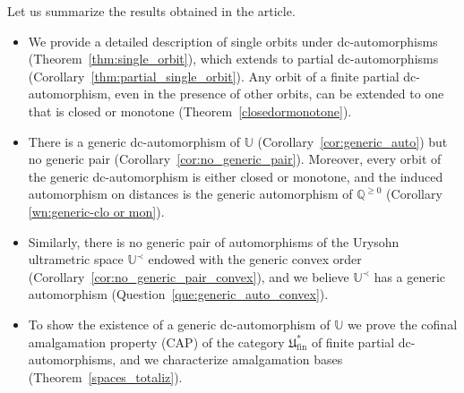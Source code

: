 \documentclass[oneside,notitlepage,12pt]{article}
\theoremstyle{definition}
\theoremstyle{remark}
\newcommand \Q {\mathbb{Q}}
\newcommand \Qpos {\Q^{\geq 0}}
\newcommand \U {\mathbb{U}}
\newcommand \fin {{\operatorname{fin}}}
\newcommand \Ult {\mathfrak{U}}
\begin{document}
Let us summarize the results obtained in the article.
\begin{itemize}
    \item We provide a detailed description of single orbits under dc-automorphisms  (Theorem~\ref{thm:single_orbit}), which extends to partial dc-automorphisms (Corollary~\ref{thm:partial_single_orbit}).
    Any orbit of a finite partial dc-automorphism, even in the presence of other orbits, can be extended to one that is closed or monotone (Theorem~\ref{closedormonotone}).
    
    \item There is a generic dc-automorphism of $\U$ (Corollary~\ref{cor:generic_auto}) but no generic pair (Corollary~\ref{cor:no_generic_pair}).
    Moreover, every orbit of the generic dc-automorphism is either closed or monotone, and the induced automorphism on distances is the generic automorphism of $\Qpos$ (Corollary \ref{wn:generic-clo or mon}).

    \item Similarly, there is no generic pair of automorphisms of the Urysohn ultrametric space $\U^\prec$ endowed with the generic convex order (Corollary~\ref{cor:no_generic_pair_convex}), and we believe $\U^\prec$ has a generic automorphism (Question~\ref{que:generic_auto_convex}).

    \item To show the existence of a generic dc-automorphism of $\U$ we prove the cofinal amalgamation property (CAP) of the category $\Ult^*_\fin$ of finite partial dc-automorphisms, and we characterize amalgamation bases (Theorem~\ref{spaces_totaliz}).


\end{itemize}
\end{document}
